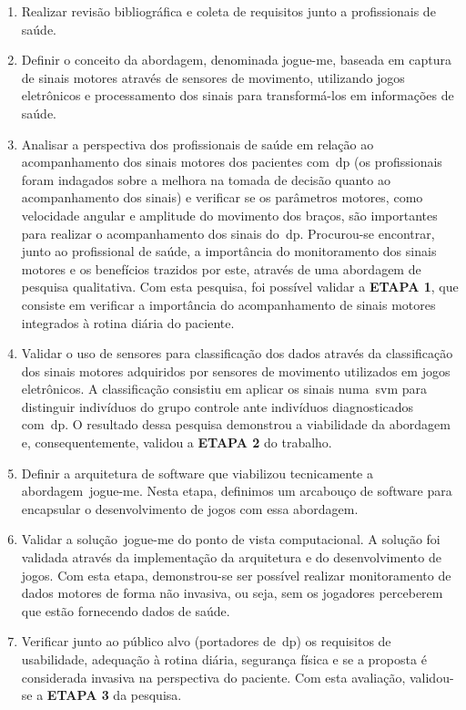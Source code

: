 \begin{enumerate}

\item{Realizar revisão bibliográfica e coleta de requisitos junto a profissionais de saúde.}

\item{Definir o conceito da abordagem, denominada \ac{jogue-me}, baseada em captura de sinais motores através de sensores de movimento, utilizando jogos eletrônicos e processamento dos sinais para transformá-los em informações de saúde.}


\item{Analisar a perspectiva dos profissionais de saúde em relação ao acompanhamento dos sinais motores dos pacientes com~\ac{dp} (os profissionais foram indagados sobre a melhora na tomada de decisão quanto ao acompanhamento dos sinais) e verificar se os parâmetros motores, como velocidade angular e amplitude do movimento dos braços, são importantes para realizar o acompanhamento dos sinais do~\ac{dp}. Procurou-se encontrar, junto ao profissional de saúde, a importância do monitoramento dos sinais motores e os benefícios trazidos por este, através de uma abordagem de pesquisa qualitativa. Com esta pesquisa, foi possível validar a \textbf{ETAPA 1}, que consiste em verificar a importância do acompanhamento de sinais motores integrados à rotina diária do paciente.}

\item{Validar o uso de sensores para classificação dos dados através da classificação dos sinais motores adquiridos por sensores de movimento utilizados em jogos eletrônicos. A classificação consistiu em aplicar os sinais numa~\ac{svm} para distinguir indivíduos do grupo controle ante indivíduos diagnosticados com~\ac{dp}.
O resultado dessa pesquisa demonstrou a viabilidade da abordagem e, consequentemente, validou a \textbf{ETAPA 2} do trabalho.}

\item{Definir a arquitetura de software que viabilizou tecnicamente a abordagem~\ac{jogue-me}. Nesta etapa, definimos um arcabouço de software para encapsular o desenvolvimento de jogos com essa abordagem.}

\item{Validar a solução~\ac{jogue-me} do ponto de vista computacional. A solução foi validada através da implementação da arquitetura e do desenvolvimento de jogos. Com esta etapa, demonstrou-se ser possível realizar monitoramento de dados motores de forma não invasiva, ou seja, sem os jogadores perceberem que estão fornecendo dados de saúde.}

\item{Verificar junto ao público alvo (portadores de~\ac{dp}) os requisitos de usabilidade, adequação à rotina diária, segurança física e se a proposta é considerada invasiva na perspectiva do paciente. Com esta avaliação, validou-se a \textbf{ETAPA 3} da pesquisa.}

\end{enumerate}

